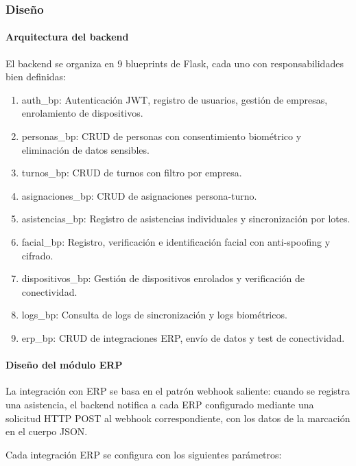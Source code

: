 \subsubsection{Diseño}

\paragraph{Arquitectura del backend}

El backend se organiza en 9 blueprints de Flask, cada uno con responsabilidades bien definidas:

\begin{enumerate}
    \item auth\_bp: Autenticación JWT, registro de usuarios, gestión de empresas, enrolamiento de dispositivos.
    \item personas\_bp: CRUD de personas con consentimiento biométrico y eliminación de datos sensibles.
    \item turnos\_bp: CRUD de turnos con filtro por empresa.
    \item asignaciones\_bp: CRUD de asignaciones persona-turno.
    \item asistencias\_bp: Registro de asistencias individuales y sincronización por lotes.
    \item facial\_bp: Registro, verificación e identificación facial con anti-spoofing y cifrado.
    \item dispositivos\_bp: Gestión de dispositivos enrolados y verificación de conectividad.
    \item logs\_bp: Consulta de logs de sincronización y logs biométricos.
    \item erp\_bp: CRUD de integraciones ERP, envío de datos y test de conectividad.
\end{enumerate}

\paragraph{Diseño del módulo ERP}

La integración con ERP se basa en el patrón webhook saliente: cuando se registra una asistencia, el backend notifica a cada ERP configurado mediante una solicitud HTTP POST al webhook correspondiente, con los datos de la marcación en el cuerpo JSON.

Cada integración ERP se configura con los siguientes parámetros:

